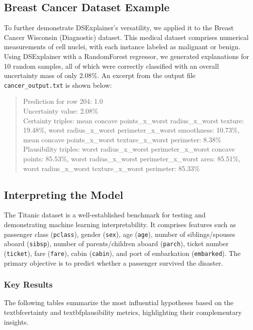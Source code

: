\documentclass[acmlarge]{acmart}
\begin{document}
\subsection{Breast Cancer Dataset Example}

To further demonstrate DSExplainer's versatility, we applied it to the Breast Cancer Wisconsin (Diagnostic) dataset. This medical dataset comprises numerical measurements of cell nuclei, with each instance labeled as malignant or benign. Using DSExplainer with a RandomForest regressor, we generated explanations for 10 random samples, all of which were correctly classified with an overall uncertainty mass of only 2.08\%. An excerpt from the output file \texttt{cancer\_output.txt} is shown below:
\begin{quote}
Prediction for row 204: 1.0\\
Uncertainty value: 2.08\%\\
Certainty triples: mean concave points\_x\_worst radius\_x\_worst texture: 19.48\%, worst radius\_x\_worst perimeter\_x\_worst smoothness: 10.73\%, mean concave points\_x\_worst texture\_x\_worst perimeter: 8.38\%\\
Plausibility triples: worst radius\_x\_worst perimeter\_x\_worst concave points: 85.53\%, worst radius\_x\_worst perimeter\_x\_worst area: 85.51\%, worst radius\_x\_worst texture\_x\_worst perimeter: 85.33\%
\end{quote}

\subsection{Interpreting the Model}

The Titanic dataset is a well-established benchmark for testing and demonstrating machine learning interpretability. It comprises features such as passenger class (\texttt{pclass}), gender (\texttt{sex}), age (\texttt{age}), number of siblings/spouses aboard (\texttt{sibsp}), number of parents/children aboard (\texttt{parch}), ticket number (\texttt{ticket}), fare (\texttt{fare}), cabin (\texttt{cabin}), and port of embarkation (\texttt{embarked}). The primary objective is to predict whether a passenger survived the disaster.


\subsubsection{Key Results}

The following tables summarize the most influential hypotheses based on the textbf{certainty} and textbf{plausibility} metrics, highlighting their complementary insights.
\end{document}
